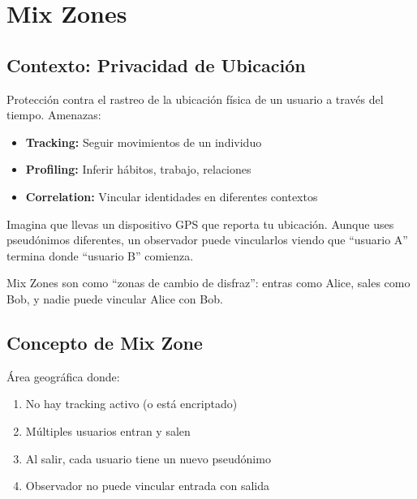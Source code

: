 \documentclass[11pt,a4paper,twoside]{book}
\begin{document}
\section{Mix Zones}
\label{sec:mixzones}

\subsection{Contexto: Privacidad de Ubicaci\'on}

\begin{definition}
Protecci\'on contra el rastreo de la ubicaci\'on f\'isica de un usuario a trav\'es del tiempo. Amenazas:
\begin{itemize}
    \item \textbf{Tracking:} Seguir movimientos de un individuo
    \item \textbf{Profiling:} Inferir h\'abitos, trabajo, relaciones
    \item \textbf{Correlation:} Vincular identidades en diferentes contextos
\end{itemize}
\end{definition}

\begin{intuicion}
Imagina que llevas un dispositivo GPS que reporta tu ubicaci\'on. Aunque uses pseud\'onimos diferentes, un observador puede vincularlos viendo que ``usuario A'' termina donde ``usuario B'' comienza.

Mix Zones son como ``zonas de cambio de disfraz'': entras como Alice, sales como Bob, y nadie puede vincular Alice con Bob.
\end{intuicion}

\subsection{Concepto de Mix Zone}

\begin{definition}
\'Area geogr\'afica donde:
\begin{enumerate}
    \item No hay tracking activo (o est\'a encriptado)
    \item M\'ultiples usuarios entran y salen
    \item Al salir, cada usuario tiene un nuevo pseud\'onimo
    \item Observador no puede vincular entrada con salida
\end{enumerate}
\end{definition}
\end{document}
